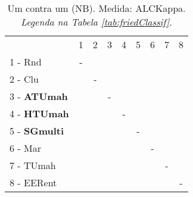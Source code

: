 \begin{table}[h]
\caption{Um contra um (NB). Medida: ALCKappa. \textit{Legenda na Tabela \ref{tab:friedClassif}.}}
\begin{center}\begin{tabular}{lcc|cc|cc|cc}
 			& 1 & 2 & 3 & 4 & 5 & 6 & 7 & 8\\
1 - Rnd  	& - &   &   &   &   &   &   &   \\
2 - Clu  	&   & - &   &   &   &   &   &   \\ \hline
3 - \textbf{ATUmah}	&   &   & - &   &   &   &   &   \\
4 - \textbf{HTUmah}	&   &   &   & - &   &   &   &   \\ \hline
5 - \textbf{SGmulti}	&   &   &   &   & - &   &   &   \\
6 - Mar  	&   &   &   &   &   & - &   &   \\ \hline
7 - TUmah	&   &   &   &   &   &   & - &   \\
8 - EERent	&   &   &   &   &   &   &   & - \\ \hline\end{tabular}
\label{stratsALCKappaFriedNBRedux}
\end{center}
\end{table}
